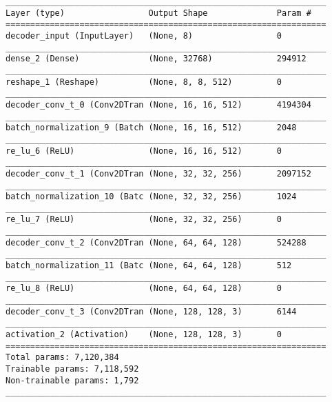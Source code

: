 \begin{lstlisting}[caption={CelebA-\ac{VAE}-\ac{GAN} Decoder},captionpos=b,basicstyle=\tiny, label={lst:mnist-vae-decoder}]
_________________________________________________________________
Layer (type)                 Output Shape              Param #
=================================================================
decoder_input (InputLayer)   (None, 8)                 0
_________________________________________________________________
dense_2 (Dense)              (None, 32768)             294912
_________________________________________________________________
reshape_1 (Reshape)          (None, 8, 8, 512)         0
_________________________________________________________________
decoder_conv_t_0 (Conv2DTran (None, 16, 16, 512)       4194304
_________________________________________________________________
batch_normalization_9 (Batch (None, 16, 16, 512)       2048
_________________________________________________________________
re_lu_6 (ReLU)               (None, 16, 16, 512)       0
_________________________________________________________________
decoder_conv_t_1 (Conv2DTran (None, 32, 32, 256)       2097152
_________________________________________________________________
batch_normalization_10 (Batc (None, 32, 32, 256)       1024
_________________________________________________________________
re_lu_7 (ReLU)               (None, 32, 32, 256)       0
_________________________________________________________________
decoder_conv_t_2 (Conv2DTran (None, 64, 64, 128)       524288
_________________________________________________________________
batch_normalization_11 (Batc (None, 64, 64, 128)       512
_________________________________________________________________
re_lu_8 (ReLU)               (None, 64, 64, 128)       0
_________________________________________________________________
decoder_conv_t_3 (Conv2DTran (None, 128, 128, 3)       6144
_________________________________________________________________
activation_2 (Activation)    (None, 128, 128, 3)       0
=================================================================
Total params: 7,120,384
Trainable params: 7,118,592
Non-trainable params: 1,792
_________________________________________________________________
\end{lstlisting}